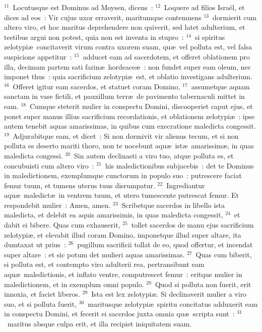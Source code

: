 ${}^{11}$~Locutusque est Dominus ad Moysen, dicens~:
${}^{12}$~Loquere ad filios Isra\"el, et dices ad eos~: Vir cujus uxor erraverit, maritumque contemnens
${}^{13}$~dormierit cum altero viro, et hoc maritus deprehendere non quiverit, sed latet adulterium, et testibus argui non potest, quia non est inventa in stupro~:
${}^{14}$~si spiritus zelotypi\ae\ concitaverit virum contra uxorem suam, qu\ae\ vel polluta est, vel falsa suspicione appetitur~:
${}^{15}$~adducet eam ad sacerdotem, et offeret oblationem pro illa, decimam partem sati farin\ae\ hordeace\ae~: non fundet super eam oleum, nec imponet thus~: quia sacrificium zelotypi\ae\ est, et oblatio investigans adulterium.
${}^{16}$~Offeret igitur eam sacerdos, et statuet coram Domino,
${}^{17}$~assumetque aquam sanctam in vase fictili, et pauxillum terr\ae\ de pavimento tabernaculi mittet in eam.
${}^{18}$~Cumque steterit mulier in conspectu Domini, discooperiet caput ejus, et ponet super manus illius sacrificium recordationis, et oblationem zelotypi\ae~: ipse autem tenebit aquas amarissimas, in quibus cum execratione maledicta congessit.
${}^{19}$~Adjurabitque eam, et dicet~: Si non dormivit vir alienus tecum, et si non polluta es deserto mariti thoro, non te nocebunt aqu\ae\ ist\ae\ amarissim\ae , in quas maledicta congessi.
${}^{20}$~Sin autem declinasti a viro tuo, atque polluta es, et concubuisti cum altero viro~:
${}^{21}$~his maledictionibus subjacebis~: det te Dominus in maledictionem, exemplumque cunctorum in populo suo~: putrescere faciat femur tuum, et tumens uterus tuus disrumpatur.
${}^{22}$~Ingrediantur aqu\ae\ maledict\ae\ in ventrem tuum, et utero tumescente putrescat femur. Et respondebit mulier~: Amen, amen.
${}^{23}$~Scribetque sacerdos in libello ista maledicta, et delebit ea aquis amarissimis, in quas maledicta congessit,
${}^{24}$~et dabit ei bibere. Quas cum exhauserit,
${}^{25}$~tollet sacerdos de manu ejus sacrificium zelotypi\ae , et elevabit illud coram Domino, imponetque illud super altare, ita dumtaxat ut prius~:
${}^{26}$~pugillum sacrificii tollat de eo, quod offertur, et incendat super altare~: et sic potum det mulieri aquas amarissimas.
${}^{27}$~Quas cum biberit, si polluta est, et contempto viro adulterii rea, pertransibunt eam aqu\ae\ maledictionis, et inflato ventre, computrescet femur~: eritque mulier in maledictionem, et in exemplum omni populo.
${}^{28}$~Quod si polluta non fuerit, erit innoxia, et faciet liberos.
${}^{29}$~Ista est lex zelotypi\ae . Si declinaverit mulier a viro suo, et si polluta fuerit,
${}^{30}$~maritusque zelotypi\ae\ spiritu concitatus adduxerit eam in conspectu Domini, et fecerit ei sacerdos juxta omnia qu\ae\ scripta sunt~:
${}^{31}$~maritus absque culpa erit, et illa recipiet iniquitatem suam.

